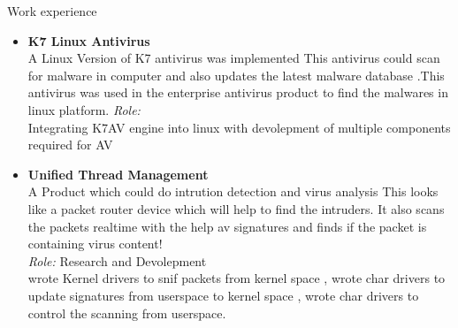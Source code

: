 \documentclass{resume}
\begin{document}
\begin{category}{Work experience}
\begin{itemize}
  \item{{\bfseries K7 Linux Antivirus}\\
  A Linux Version of K7 antivirus was implemented 
  This antivirus could scan for malware in computer and also updates 
  the latest malware database .This antivirus was used in the enterprise antivirus
  product to find the malwares in linux platform.
  {\it Role:}\\
  Integrating K7AV engine into linux with devolepment of multiple components required for AV\\
  }

  \item {{\bfseries Unified Thread Management}\\
  A Product which could do intrution detection and virus analysis
  This looks like a packet router device which will help to find the intruders.
  It also scans the packets realtime with the help av signatures and finds if 
  the packet is containing virus content!\\
  {\it Role:}
  Research and Devolepment\\
  wrote Kernel drivers to snif packets from kernel space , wrote char drivers to 
  update signatures from userspace to kernel space , wrote char drivers to control
  the scanning from userspace.\\
  }

  \end{itemize}

\end{category}
\end{document}
